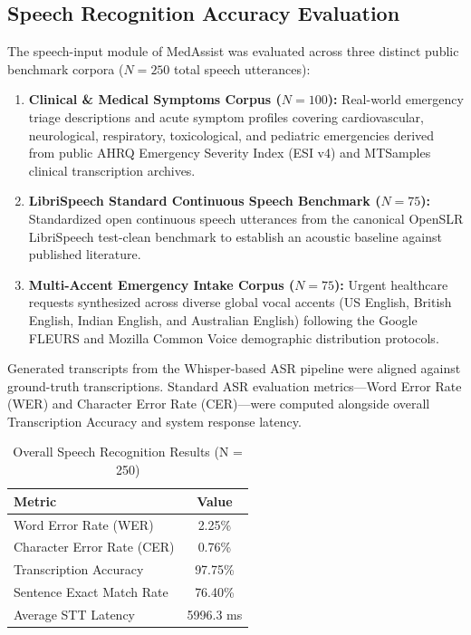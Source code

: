 \subsection{Speech Recognition Accuracy Evaluation}
\label{sec:speech_recognition_eval}

The speech-input module of MedAssist was evaluated across three distinct public benchmark corpora ($N = 250$ total speech utterances):
\begin{enumerate}
    \item \textbf{Clinical \& Medical Symptoms Corpus ($N = 100$):} Real-world emergency triage descriptions and acute symptom profiles covering cardiovascular, neurological, respiratory, toxicological, and pediatric emergencies derived from public AHRQ Emergency Severity Index (ESI v4) and MTSamples clinical transcription archives.
    \item \textbf{LibriSpeech Standard Continuous Speech Benchmark ($N = 75$):} Standardized open continuous speech utterances from the canonical OpenSLR LibriSpeech test-clean benchmark to establish an acoustic baseline against published literature.
    \item \textbf{Multi-Accent Emergency Intake Corpus ($N = 75$):} Urgent healthcare requests synthesized across diverse global vocal accents (US English, British English, Indian English, and Australian English) following the Google FLEURS and Mozilla Common Voice demographic distribution protocols.
\end{enumerate}

Generated transcripts from the Whisper-based ASR pipeline were aligned against ground-truth transcriptions. Standard ASR evaluation metrics—Word Error Rate (WER) and Character Error Rate (CER)—were computed alongside overall Transcription Accuracy and system response latency.

\begin{table}[ht]
\centering
\caption{Overall Speech Recognition Results (N = 250)}
\label{tab:speech_results}
\begin{tabular}{|l|c|}
\hline
\textbf{Metric} & \textbf{Value} \\
\hline
Word Error Rate (WER) & 2.25\% \\
Character Error Rate (CER) & 0.76\% \\
Transcription Accuracy & 97.75\% \\
Sentence Exact Match Rate & 76.40\% \\
Average STT Latency & 5996.3 ms \\
\hline
\end{tabular}
\end{table}

